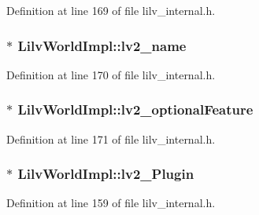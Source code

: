 Definition at line 169 of file lilv\+\_\+internal.\+h.

\subsubsection[{\texorpdfstring{lv2\+\_\+name}{lv2_name}}]{$\ast$ Lilv\+World\+Impl\+::lv2\+\_\+name}\hypertarget{struct_lilv_world_impl_ad3613c419988aeb5285b83f37d0a4209}{}\label{struct_lilv_world_impl_ad3613c419988aeb5285b83f37d0a4209}


Definition at line 170 of file lilv\+\_\+internal.\+h.

\subsubsection[{\texorpdfstring{lv2\+\_\+optional\+Feature}{lv2_optionalFeature}}]{$\ast$ Lilv\+World\+Impl\+::lv2\+\_\+optional\+Feature}\hypertarget{struct_lilv_world_impl_abd89faa2d41e360c8bd41bfb6edb38a7}{}\label{struct_lilv_world_impl_abd89faa2d41e360c8bd41bfb6edb38a7}


Definition at line 171 of file lilv\+\_\+internal.\+h.

\subsubsection[{\texorpdfstring{lv2\+\_\+\+Plugin}{lv2_Plugin}}]{$\ast$ Lilv\+World\+Impl\+::lv2\+\_\+\+Plugin}\hypertarget{struct_lilv_world_impl_a6338b09cafac32b69077b76c08be02a5}{}\label{struct_lilv_world_impl_a6338b09cafac32b69077b76c08be02a5}


Definition at line 159 of file lilv\+\_\+internal.\+h.

